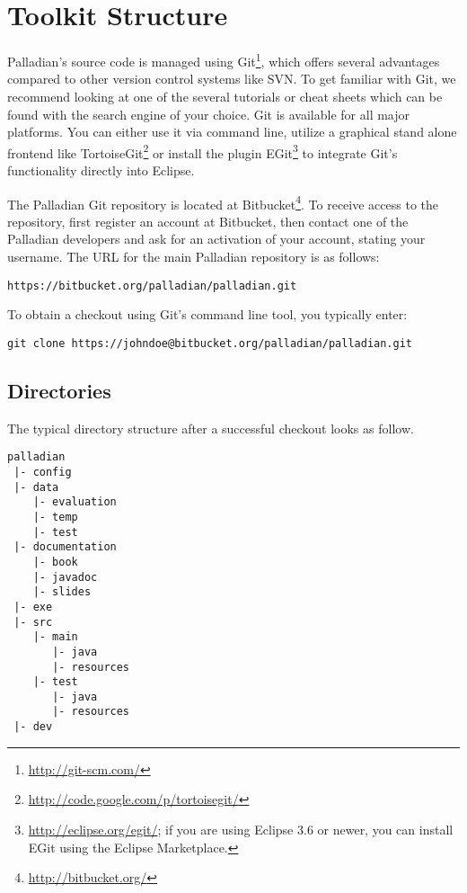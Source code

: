 \chapter{Toolkit Structure}
\label{sec:toolkitstructure}

Palladian's source code is managed using Git\footnote{\url{http://git-scm.com/}}, which offers several advantages compared to other version control systems like SVN. To get familiar with Git, we recommend looking at one of the several tutorials or cheat sheets which can be found with the search engine of your choice. Git is available for all major platforms. You can either use it via command line, utilize a graphical stand alone frontend like TortoiseGit\footnote{\url{http://code.google.com/p/tortoisegit/}} or install the plugin EGit\footnote{\url{http://eclipse.org/egit/}; if you are using Eclipse 3.6 or newer, you can install EGit using the Eclipse Marketplace.} to integrate Git's functionality directly into Eclipse.

The Palladian Git repository is located at Bitbucket\footnote{\url{http://bitbucket.org/}}. To receive access to the repository, first register an account at Bitbucket, then contact one of the Palladian developers and ask for an activation of your account, stating your username. The URL for the main Palladian repository is as follows:

\begin{verbatim}
https://bitbucket.org/palladian/palladian.git
\end{verbatim}

To obtain a checkout using Git's command line tool, you typically enter:

\begin{verbatim}
git clone https://johndoe@bitbucket.org/palladian/palladian.git
\end{verbatim}

\section{Directories}

The typical directory structure after a successful checkout looks as follow.

\begin{verbatim}
palladian
 |- config
 |- data
    |- evaluation
    |- temp
    |- test
 |- documentation
    |- book
    |- javadoc
    |- slides
 |- exe
 |- src
    |- main
       |- java
       |- resources
    |- test
       |- java
       |- resources
 |- dev
\end{verbatim}

